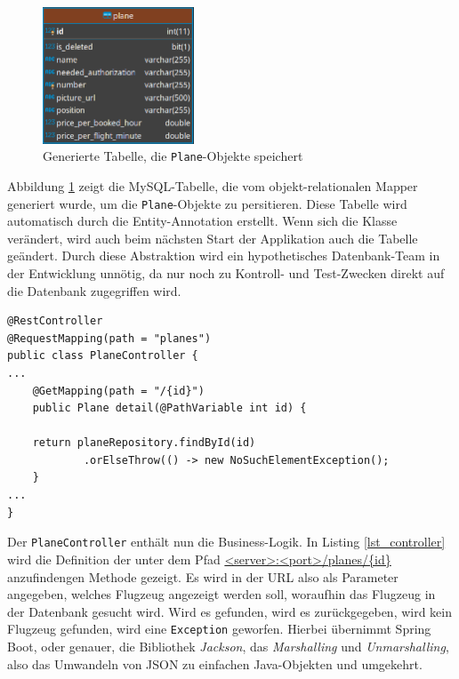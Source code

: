 \documentclass[a4paper, 11pt]{article}
\begin{document}
\begin{figure}[htpb]
    \centering
    \includegraphics[width=0.4\textwidth]{images/erm/plane1.png}
    \caption{Generierte Tabelle, die \texttt{Plane}-Objekte speichert}
    \label{fig:plane_table}
\end{figure}

Abbildung \ref{fig:plane_table} zeigt die MySQL-Tabelle, die vom
objekt-relationalen Mapper generiert wurde, um die \texttt{Plane}-Objekte zu
persitieren. Diese Tabelle wird automatisch durch die Entity-Annotation
erstellt. Wenn sich die Klasse verändert, wird auch beim nächsten Start der
Applikation auch die Tabelle geändert. Durch diese Abstraktion wird ein
hypothetisches Datenbank-Team in der Entwicklung unnötig, da nur noch zu
Kontroll- und Test-Zwecken direkt auf die Datenbank zugegriffen wird.


\begin{lstlisting}[caption=Ausschnitt eines REST-Controllers, label=lst_controller, float]
@RestController
@RequestMapping(path = "planes")
public class PlaneController {
...
    @GetMapping(path = "/{id}")
    public Plane detail(@PathVariable int id) {

    return planeRepository.findById(id)
            .orElseThrow(() -> new NoSuchElementException();
    }
...
}
\end{lstlisting}


Der \texttt{PlaneController} enthält nun die Business-Logik.  In Listing
\ref{lst_controller} wird die Definition der unter dem Pfad
\url{<server>:<port>/planes/{id}} anzufindengen Methode gezeigt. Es wird in der
URL also als Parameter angegeben, welches Flugzeug angezeigt werden soll, woraufhin
das Flugzeug in der Datenbank gesucht wird. Wird es gefunden, wird es
zurückgegeben, wird kein Flugzeug gefunden, wird eine \lstinline{Exception}
geworfen. Hierbei übernimmt Spring Boot, oder genauer, die Bibliothek
\emph{Jackson}, das \emph{Marshalling} und \emph{Unmarshalling}, also das
Umwandeln von JSON zu einfachen Java-Objekten und umgekehrt. 
\end{document}
